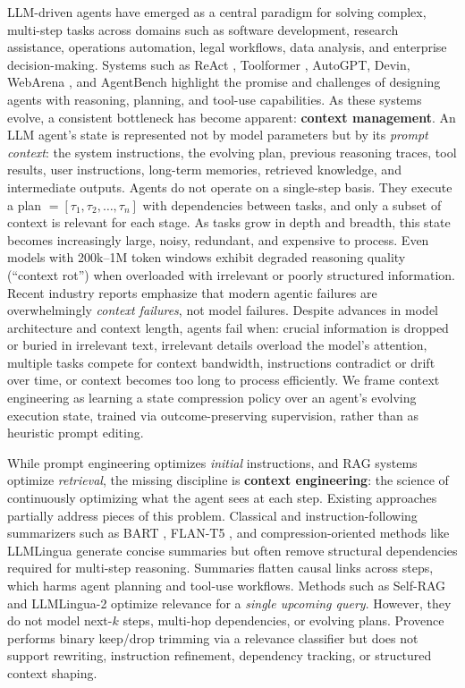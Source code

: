 \documentclass{article}
\theoremstyle{plain}
\theoremstyle{definition}
\theoremstyle{remark}
\begin{document}
LLM-driven agents have emerged as a central paradigm for solving complex, multi-step tasks across domains such as software development, research assistance, operations automation, legal workflows, data analysis, and enterprise decision-making. Systems such as ReAct \citep{react}, Toolformer \citep{toolformer}, AutoGPT, Devin, WebArena \citep{webarena}, and AgentBench \citep{agentbench} highlight the promise and challenges of designing agents with reasoning, planning, and tool-use capabilities. As these systems evolve, a consistent bottleneck has become apparent: \textbf{context management}. An LLM agent's state is represented not by model parameters but by its \emph{prompt context}: the system instructions, the evolving plan, previous reasoning traces, tool results, user instructions, long-term memories, retrieved knowledge, and intermediate outputs. Agents do not operate on a single-step basis.  
They execute a plan $ = [\tau_1, \tau_2, \ldots, \tau_n]$ with dependencies between tasks, and only a subset of context is relevant for each stage. As tasks grow in depth and breadth, this state becomes increasingly large, noisy, redundant, and expensive to process. Even models with 200k–1M token windows exhibit degraded reasoning quality (“context rot”) when overloaded with irrelevant or poorly structured information. Recent industry reports emphasize that modern agentic failures are overwhelmingly \emph{context failures}, not model failures. Despite advances in model architecture and context length, agents fail when: crucial information is dropped or buried in irrelevant text, irrelevant details overload the model’s attention, multiple tasks compete for context bandwidth, instructions contradict or drift over time, or context becomes too long to process efficiently. We frame context engineering as learning a state compression policy over an agent’s evolving execution state, trained via outcome-preserving supervision, rather than as heuristic prompt editing. 




While prompt engineering optimizes \emph{initial} instructions, and RAG systems optimize \emph{retrieval}, the missing discipline is \textbf{context engineering}: the science of continuously optimizing what the agent sees at each step. Existing approaches partially address pieces of this problem. Classical and instruction-following summarizers such as BART \citep{lewis2019bart}, 
FLAN-T5 \citep{chung2022flan}, and compression-oriented methods like LLMLingua 
\citep{jiang2023llmlingua} generate concise summaries but often remove structural 
dependencies required for multi-step reasoning. Summaries flatten causal links across 
steps, which harms agent planning and tool-use workflows. Methods such as Self-RAG \citep{asai2024selfrag} and LLMLingua-2 
\citep{jiang2024llmlingua2} optimize relevance for a \emph{single upcoming query}. 
However, they do not model next-$k$ steps, multi-hop dependencies, or evolving plans. Provence \citep{wu2024provence} performs binary keep/drop trimming via a relevance 
classifier but does not support rewriting, instruction refinement, dependency tracking, 
or structured context shaping.
\end{document}
